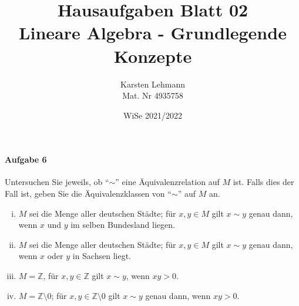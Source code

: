 \documentclass{scrreprt}
\author{Karsten Lehmann\\Mat. Nr 4935758}
\date{WiSe 2021/2022}
\title{Hausaufgaben Blatt 02\\Lineare Algebra - Grundlegende Konzepte}
\begin{document}
\paragraph{Aufgabe 6} Untersuchen Sie jeweils, ob ``$\sim$'' eine
Äquivalenzrelation auf $M$ ist.
Falls dies der Fall ist, geben Sie die Äquivalenzklassen von ``$\sim$'' auf
$M$ an.
\begin{enumerate}[(i)]
\item $M$ sei die Menge aller deutschen Städte; für $x, y \in M$ gilt
  $x \sim y$ genau dann, wenn $x$ und $y$ im selben Bundesland liegen.

\item $M$ sei die Menge aller deutschen Städte; für $x, y \in M$ gilt
  $x \sim y$ genau dann, wenn $x$ oder $y$ in Sachsen liegt.

\item $M = \mathbb{Z}$, für $x, y \in \mathbb{Z}$ gilt $x \sim y$, wenn
  $xy > 0$.

\item $M = \mathbb{Z} \setminus \qty{0}$; für
  $x, y \in \mathbb{Z} \setminus \qty{0}$ gilt $x \sim y$ genau dann, wenn
  $xy > 0$.
\end{enumerate}
\end{document}
